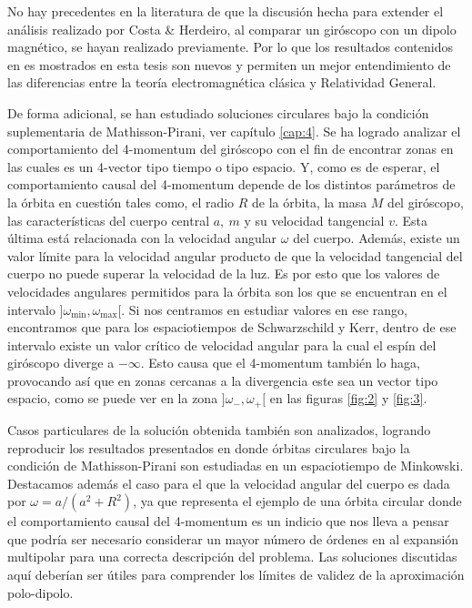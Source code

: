 No hay precedentes en la literatura de que la discusión hecha para extender el análisis realizado por Costa \& Herdeiro, al comparar un giróscopo con un dipolo magnético, se hayan realizado previamente. Por lo que los resultados contenidos en es mostrados en esta tesis son nuevos y permiten un mejor entendimiento de las diferencias entre la teoría electromagnética clásica y Relatividad General.

De forma adicional, se han estudiado soluciones circulares bajo la condición suplementaria de Mathisson-Pirani, ver capítulo \ref{cap:4}. Se ha logrado analizar el comportamiento del 4-momentum del giróscopo con el fin de encontrar zonas en las cuales es un 4-vector tipo tiempo o tipo espacio. Y, como es de esperar, el comportamiento causal del 4-momentum depende de los distintos parámetros de la órbita en cuestión tales como, el radio $R$ de la órbita, la masa $M$ del giróscopo, las características del cuerpo central $a,\ m$ y su velocidad tangencial $v$. Esta última está relacionada con la velocidad angular $\omega$ del cuerpo. Además, existe un valor límite para la velocidad angular producto de que la velocidad tangencial del cuerpo no puede superar la velocidad de la luz. Es por esto que los valores de velocidades angulares permitidos para la órbita son los que se encuentran en el intervalo $]\omega_{\mathrm{min}}, \omega_{\mathrm{max}}[$. Si nos centramos en estudiar valores en ese rango, encontramos que para los espaciotiempos de Schwarzschild y Kerr, dentro de ese intervalo existe un valor crítico de velocidad angular para la cual el espín del giróscopo diverge a $-\infty$. Esto causa que el 4-momentum también lo haga, provocando así que en zonas cercanas a la divergencia este sea un vector tipo espacio, como se puede ver en la zona $]\omega_-, \omega_+[$ en las figuras \ref{fig:2} y \ref{fig:3}.

Casos particulares de la solución obtenida también son analizados, logrando reproducir los resultados presentados en \cite{Costa-Herdeiro-Natario-Zilhao} donde órbitas circulares bajo la condición de Mathisson-Pirani son estudiadas en un espaciotiempo de Minkowski. Destacamos además el caso para el que la velocidad angular del cuerpo es dada por $\omega = a/(a^2+R^2)$, ya que representa el ejemplo de una órbita circular donde el comportamiento causal del 4-momentum es un indicio que nos lleva a pensar que podría ser necesario considerar un mayor número de órdenes en al expansión multipolar para una correcta descripción del problema. Las soluciones discutidas aquí deberían ser útiles para comprender los límites de validez de la aproximación polo-dipolo. 


